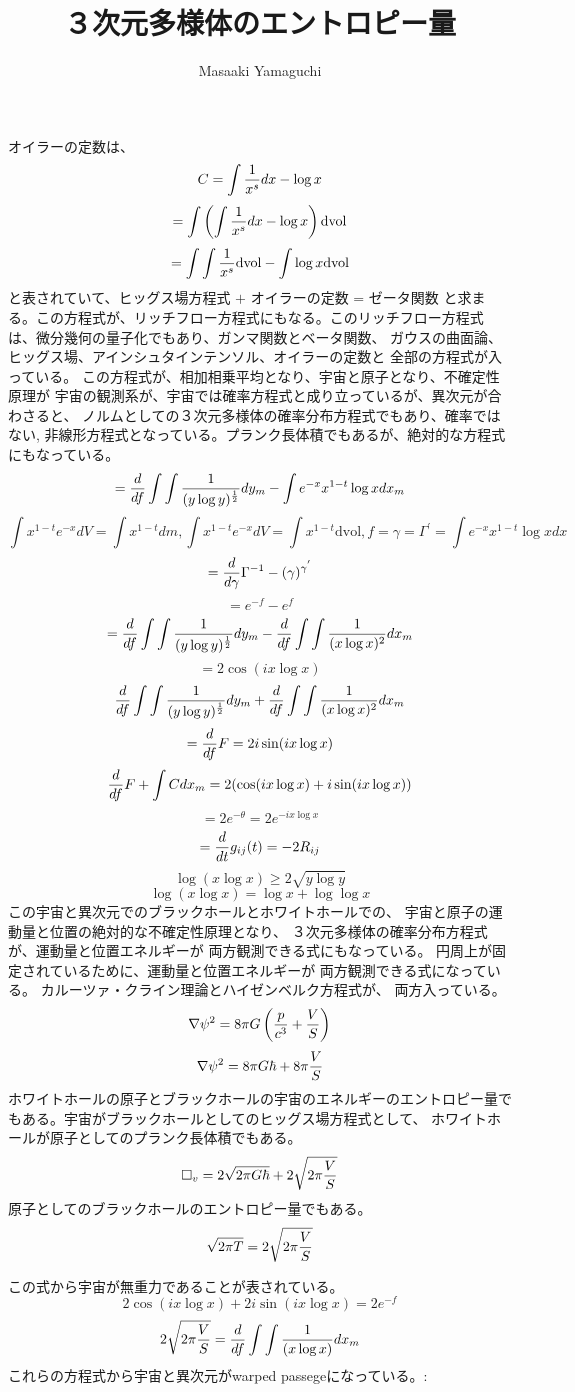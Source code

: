 \documentclass{jsarticle}
\begin{document}
\title{３次元多様体のエントロピー量}
\author{Masaaki Yamaguchi}
\date{}
\maketitle

  オイラーの定数は、
  $$ C = \int {1 \over x^s}dx - \log x $$
  $$ = \int \left(\int {1 \over x^s}dx - \log x \right)\mathrm{dvol} $$
  $$ = \int \int{1 \over x^s}\mathrm{dvol} - \int  \log x \mathrm{dvol} $$
  と表されていて、$ \text{ヒッグス場方程式 + オイラーの定数 = ゼータ関数} $
  と求まる。この方程式が、リッチフロー方程式にもなる。このリッチフロー方程式
  は、微分幾何の量子化でもあり、ガンマ関数とベータ関数、
  ガウスの曲面論、ヒッグス場、アインシュタインテンソル、オイラーの定数と
  全部の方程式が入っている。
  この方程式が、相加相乗平均となり、宇宙と原子となり、不確定性原理が
  宇宙の観測系が、宇宙では確率方程式と成り立っているが、異次元が合わさると、
  ノルムとしての３次元多様体の確率分布方程式でもあり、確率ではない,
  非線形方程式となっている。プランク長体積でもあるが、絶対的な方程式
  にもなっている。
  $$ = {d \over df} \int \int{1 \over (y \log y)^{1 \over 2}}dy_m 
  - \int e^{-x}x^{1 - t} \log x dx_m $$
  $$ \int x^{1 - t}e^{-x}dV = \int x^{1 - t}dm, \int x^{1 - t}e^{-x}dV
  = \int x^{1 - t}\mathrm{dvol}, f = \gamma = \Gamma^{'} = \int 
  e^{-x}x^{1 - t} \log x dx $$
  $$ = {d \over d \gamma}\Gamma^{-1} - (\gamma)^{\gamma^{'}} $$
  $$ = e^{-f} - e^{f} $$
  $$ = {d \over df}\int \int{1 \over (y \log y)^{1 \over 2}}dy_m
  - {d \over df}\int\int {1 \over (x \log x)^2}dx_m $$
  $$ = 2 \cos (i x \log x) $$
  $$  {d \over df}\int\int{1 \over (y \log y)^{1 \over 2}}dy_m
  + {d \over df}\int\int{1 \over (x \log x)^2}dx_m $$
  $$ = {d \over df}F = 2 i \sin (i x \log x) $$
  $$ {d \over df}F + \int C dx_m  
  = 2 (\cos( i x \log x) + i \sin(i x \log x)) $$
  $$ = 2 e^{- \theta} = 2 e^{- i x \log x} $$
  $$ = {d \over dt}g_{ij}(t) = - 2 R_{ij} $$
  $$ \log (x \log x) \ge 2 \sqrt{y \log y} $$
  $$ \log(x \log x) = \log x + \log \log x $$
  この宇宙と異次元でのブラックホールとホワイトホールでの、
  宇宙と原子の運動量と位置の絶対的な不確定性原理となり、
  ３次元多様体の確率分布方程式が、運動量と位置エネルギーが
  両方観測できる式にもなっている。
  円周上が固定されているために、運動量と位置エネルギーが
  両方観測できる式になっている。
  カルーツァ・クライン理論とハイゼンベルク方程式が、
  両方入っている。
  $$ \nabla \psi^2 = 8 \pi G\left({p \over c^3} + {V \over S}\right) $$
  $$ \nabla \psi^2 = 8 \pi G \hbar + 8 \pi {V \over S} $$
  ホワイトホールの原子とブラックホールの宇宙のエネルギーのエントロピー量で
  もある。宇宙がブラックホールとしてのヒッグス場方程式として、
  ホワイトホールが原子としてのプランク長体積でもある。
  $$ \square_v = 2 \sqrt{2 \pi G \hbar} + 2 \sqrt{2 \pi {V \over S}} $$
  原子としてのブラックホールのエントロピー量でもある。
  $$ \sqrt{2 \pi T} = 2 \sqrt{2 \pi{V \over S}} $$

  この式から宇宙が無重力であることが表されている。
  $$ 2 \cos (i x \log x) + 2 i \sin(i x \log x) = 2 e^{-f} $$
  $$ 2 \sqrt{2 \pi {V \over S}} = {d \over df} 
  \int \int{1 \over (x \log x)}dx_m$$
  これらの方程式から宇宙と異次元がwarped passegeになっている。:
\end{document}
